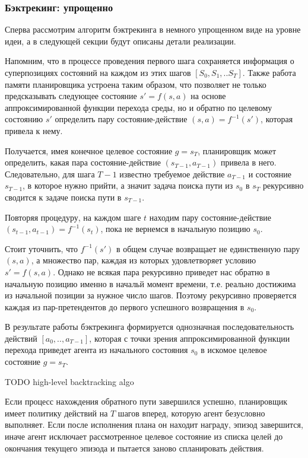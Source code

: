 \documentclass[a4paper]{article}
\begin{document}
\subsubsection{Бэктрекинг: упрощенно}

Сперва рассмотрим алгоритм бэктрекинга в немного упрощенном виде на уровне идеи, а в следующей секции будут описаны детали реализации.

Напомним, что в процессе проведения первого шага сохраняется информация о суперпозициях состояний на каждом из этих шагов $[S_0, S_1, .. S_T]$. Также работа памяти планировщика устроена таким образом, что позволяет не только предсказывать следующее состояние $s' = f(s, a)$ на основе аппроксимированной функции перехода среды, но и обратно по целевому состоянию $s'$ определить пару состояние-действие $(s, a) = f^{-1}(s')$, которая привела к нему.

Получается, имея конечное целевое состояние $g = s_T$, планировщик может определить, какая пара состояние-действие $(s_{T-1}, a_{T-1})$ привела в него. Следовательно, для шага $T-1$ известно требуемое действие $a_{T-1}$ и состояние $s_{T-1}$, в которое нужно прийти, а значит задача поиска пути из $s_0$ в $s_T$ рекурсивно сводится к задаче поиска пути в $s_{T-1}$.

Повторяя процедуру, на каждом шаге $t$ находим пару состояние-действие $(s_{t-1}, a_{t-1}) = f^{-1}(s_t)$, пока не вернемся в начальную позицию $s_0$.

Стоит уточнить, что $f^{-1}(s')$ в общем случае возвращает не единственную пару $(s, a)$, а множество пар, каждая из которых удовлетворяет условию $s' = f(s, a)$. Однако не всякая пара рекурсивно приведет нас обратно в начальную позицию именно в начальй момент времени, т.е. реально достижима из начальной позиции за нужное число шагов. Поэтому рекурсивно проверяется каждая из пар-претендентов до первого успешного возвращения в $s_0$.

В результате работы бэктрекинга формируется однозначная последовательность действий $[a_0, .. , a_{T-1}]$, которая с точки зрения аппроксимированной функции перехода приведет агента из начального состояния $s_0$ в искомое целевое состояние $g = s_T$.

TODO high-level backtracking algo

Если процесс нахождения обратного пути завершился успешно, планировщик имеет политику действий на $T$ шагов вперед, которую агент безусловно выполняет. Если после исполнения плана он находит награду, эпизод завершится, иначе агент исключает рассмотренное целевое состояние из списка целей до окончания текущего эпизода и пытается заново спланировать действия.
\end{document}
